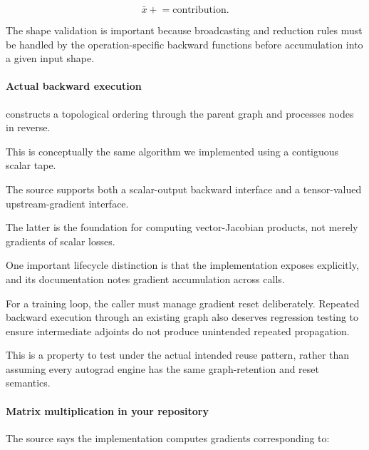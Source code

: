 \[
\bar x\mathrel{+}=\text{contribution}.
\]

The shape validation is important because broadcasting and reduction rules must be handled by the operation-specific backward functions before accumulation into a given input shape.

\paragraph{Actual backward execution}\label{02-foundations-ii-ch022-actual-backward-execution}

\hypertarget{02-foundations-ii-ch022-actual-backward-execution}{}

 constructs a topological ordering through the parent graph and processes nodes in reverse.

This is conceptually the same algorithm we implemented using a contiguous scalar tape.

The source supports both a scalar-output backward interface and a tensor-valued upstream-gradient interface.

The latter is the foundation for computing vector-Jacobian products, not merely gradients of scalar losses.

One important lifecycle distinction is that the implementation exposes  explicitly, and its documentation notes gradient accumulation across calls.

For a training loop, the caller must manage gradient reset deliberately. Repeated backward execution through an existing graph also deserves regression testing to ensure intermediate adjoints do not produce unintended repeated propagation.

This is a property to test under the actual intended reuse pattern, rather than assuming every autograd engine has the same graph-retention and reset semantics.

\paragraph{Matrix multiplication in your repository}\label{02-foundations-ii-ch022-matrix-multiplication-in-your-repository}

\hypertarget{02-foundations-ii-ch022-matrix-multiplication-in-your-repository}{}

The source says the  implementation computes gradients corresponding to:

